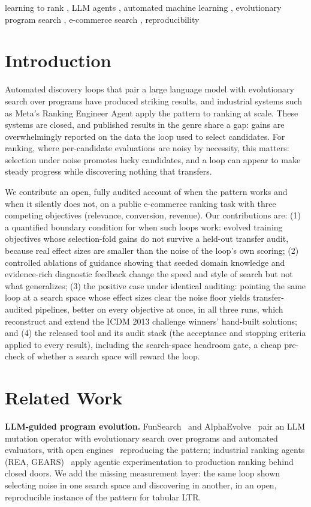 \documentclass[]{ceurart}
\begin{document}
\begin{keywords}
  learning to rank \sep
  LLM agents \sep
  automated machine learning \sep
  evolutionary program search \sep
  e-commerce search \sep
  reproducibility
\end{keywords}

\maketitle

\section{Introduction}
Automated discovery loops that pair a large language model with evolutionary
search over programs have produced striking results, and industrial systems
such as Meta's Ranking Engineer Agent apply the pattern to ranking at scale.
These systems are closed, and published results in the genre share a gap:
gains are overwhelmingly reported on the data the loop used to select
candidates. For ranking, where per-candidate evaluations are noisy by
necessity, this matters: selection under noise promotes lucky candidates,
and a loop can appear to make steady progress while discovering nothing
that transfers.

We contribute an open, fully audited account of when the pattern works
and when it silently does not, on a public e-commerce ranking task with
three competing objectives (relevance, conversion, revenue). Our contributions are:
(1) a quantified boundary condition for when such loops work: evolved training objectives whose selection-fold gains do not survive a
held-out transfer audit, because real effect sizes are smaller than the
noise of the loop's own scoring; (2) controlled ablations of guidance showing
that seeded domain knowledge and evidence-rich diagnostic feedback change the
speed and style of search but not what generalizes; (3) the positive case under identical auditing: pointing the same loop at a search space whose
effect sizes clear the noise floor yields transfer-audited pipelines,
better on every objective at once, in all three runs, which reconstruct and extend the ICDM 2013 challenge winners' hand-built
solutions; and (4) the released tool and its audit stack (the acceptance and stopping criteria applied to every result), including the search-space headroom gate, a cheap pre-check of whether a search space
will reward the loop.

\section{Related Work}
\textbf{LLM-guided program evolution.} FunSearch~\cite{funsearch} and
AlphaEvolve~\cite{alphaevolve} pair an LLM
mutation operator with evolutionary search over programs and automated
evaluators, with open engines~\cite{adaevolve,evox} reproducing the pattern;
industrial ranking agents (REA, GEARS)~\cite{rea} apply agentic
experimentation to production ranking behind closed doors. We add the missing measurement layer: the same loop shown selecting noise
in one search space and discovering in another, in an open, reproducible
instance of the pattern for tabular LTR.
\end{document}
